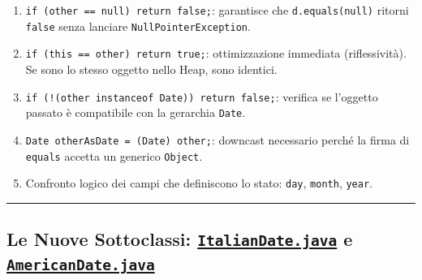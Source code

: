 \documentclass[11pt,a4paper,oneside]{report}
\newcommand{\passthrough}[1]{#1}
\providecommand{\tightlist}{\setlength{\itemsep}{0pt}\setlength{\parskip}{0pt}}
\begin{document}
\begin{enumerate}
\def\labelenumi{\arabic{enumi}.}
\tightlist
\item
  \passthrough{\lstinline!if (other == null) return false;!}: garantisce
  che \passthrough{\lstinline!d.equals(null)!} ritorni
  \passthrough{\lstinline!false!} senza lanciare
  \passthrough{\lstinline!NullPointerException!}.
\item
  \passthrough{\lstinline!if (this == other) return true;!}:
  ottimizzazione immediata (riflessività). Se sono lo stesso oggetto
  nello Heap, sono identici.
\item
  \passthrough{\lstinline"if (!(other instanceof Date)) return false;"}:
  verifica se l'oggetto passato è compatibile con la gerarchia
  \passthrough{\lstinline!Date!}.
\item
  \passthrough{\lstinline!Date otherAsDate = (Date) other;!}: downcast
  necessario perché la firma di \passthrough{\lstinline!equals!} accetta
  un generico \passthrough{\lstinline!Object!}.
\item
  Confronto logico dei campi che definiscono lo stato:
  \passthrough{\lstinline!day!}, \passthrough{\lstinline!month!},
  \passthrough{\lstinline!year!}.
\end{enumerate}

\begin{center}\rule{0.5\linewidth}{0.5pt}\end{center}

\subsection{\texorpdfstring{Le Nuove Sottoclassi:
\href{file:///home/wally/Documenti/GitHub/Programmazione-II/25-26/Teoria-e-Esercitazioni/Codice-20260902/Lezione11/MavenDate/src/main/java/it/oop/core/ItalianDate.java}{\texttt{ItalianDate.java}}
e
\href{file:///home/wally/Documenti/GitHub/Programmazione-II/25-26/Teoria-e-Esercitazioni/Codice-20260902/Lezione11/MavenDate/src/main/java/it/oop/core/AmericanDate.java}{\texttt{AmericanDate.java}}}{Le Nuove Sottoclassi: ItalianDate.java e AmericanDate.java}}\label{chap10_le-nuove-sottoclassi-italiandate.java-e-americandate.java}
\end{document}
